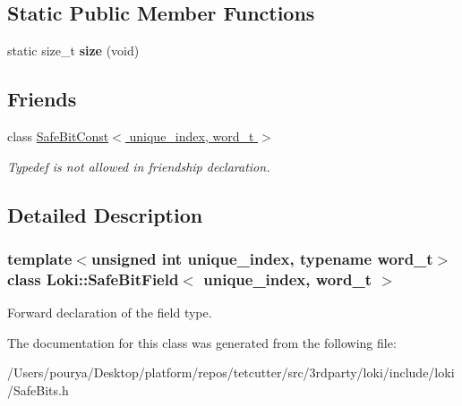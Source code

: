 \subsection*{Static Public Member Functions}
\begin{DoxyCompactItemize}
\item 
\hypertarget{classLoki_1_1SafeBitField_ad4d74f806218105d06d58f66d6ce5345}{}static size\+\_\+t {\bfseries size} (void)\label{classLoki_1_1SafeBitField_ad4d74f806218105d06d58f66d6ce5345}

\end{DoxyCompactItemize}
\subsection*{Friends}
\begin{DoxyCompactItemize}
\item 
\hypertarget{classLoki_1_1SafeBitField_aa0dafdf81cd102b0ada6632b21e21573}{}class \hyperlink{classLoki_1_1SafeBitField_aa0dafdf81cd102b0ada6632b21e21573}{Safe\+Bit\+Const$<$ unique\+\_\+index, word\+\_\+t $>$}\label{classLoki_1_1SafeBitField_aa0dafdf81cd102b0ada6632b21e21573}

\begin{DoxyCompactList}\small\item\em Typedef is not allowed in friendship declaration. \end{DoxyCompactList}\end{DoxyCompactItemize}


\subsection{Detailed Description}
\subsubsection*{template$<$unsigned int unique\+\_\+index, typename word\+\_\+t$>$class Loki\+::\+Safe\+Bit\+Field$<$ unique\+\_\+index, word\+\_\+t $>$}

Forward declaration of the field type. 

The documentation for this class was generated from the following file\+:\begin{DoxyCompactItemize}
\item 
/\+Users/pourya/\+Desktop/platform/repos/tetcutter/src/3rdparty/loki/include/loki/Safe\+Bits.\+h\end{DoxyCompactItemize}
